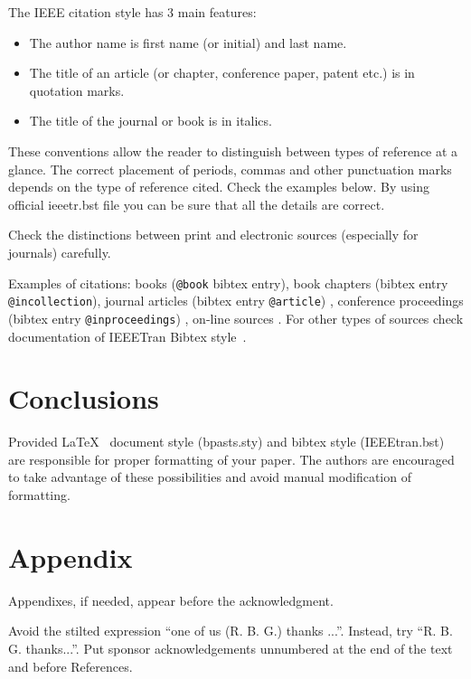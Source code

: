 \documentclass[10pt,twoside,twocolumn,a4paper]{article}
\begin{document}
The IEEE citation style has 3 main features:
\begin{itemize}
\item The author name is first name (or initial) and last name.
\item The title of an article (or chapter, conference paper, patent etc.) is in quotation marks.
\item The title of the journal or book is in italics.
\end{itemize}

These conventions allow the reader to distinguish between types of reference at a glance. The correct placement of periods, commas and other punctuation marks depends on the type of reference cited. Check the examples below. By using official ieeetr.bst file you can be sure that all the details are correct.

Check the distinctions between print and electronic sources (especially for journals) carefully.

Examples of citations: 
books (\verb+@book+ bibtex entry)\cite{kazmierkowski1994automatic}\cite{wilamowski2018power},
book chapters (bibtex entry \verb+@incollection+)\cite{urry2016photosynthesis}\cite{kazmierkowski2011control},
journal articles (bibtex entry \verb+@article+) \cite{mann1999northern}\cite{kaczorek2005generalization}\cite{stando2020constant}, 
conference proceedings (bibtex entry \verb+@inproceedings+)  \cite{lizotte2016multi}\cite{kocsis2006uct},
on-line sources \cite{gelly2012grand}\cite{zotero_zotero_2018}\cite{ieeetranbst}.
For other types of sources check documentation of IEEETran Bibtex style~\cite{ieeetranbst}.


\section{Conclusions}

Provided \LaTeX~ document style (bpasts.sty) and bibtex style (IEEEtran.bst) are responsible for proper formatting of your paper. The authors are encouraged to take advantage of these possibilities and avoid manual modification of formatting.

\section*{Appendix}
Appendixes, if needed, appear before the acknowledgment.

\begin{acknowledgements}
Avoid the stilted expression “one of us (R. B. G.) thanks ...”.  Instead, try “R. B. G. thanks...”. Put sponsor acknowledgements unnumbered at the end of the text and before References.
\end{acknowledgements}

%



\end{document}
